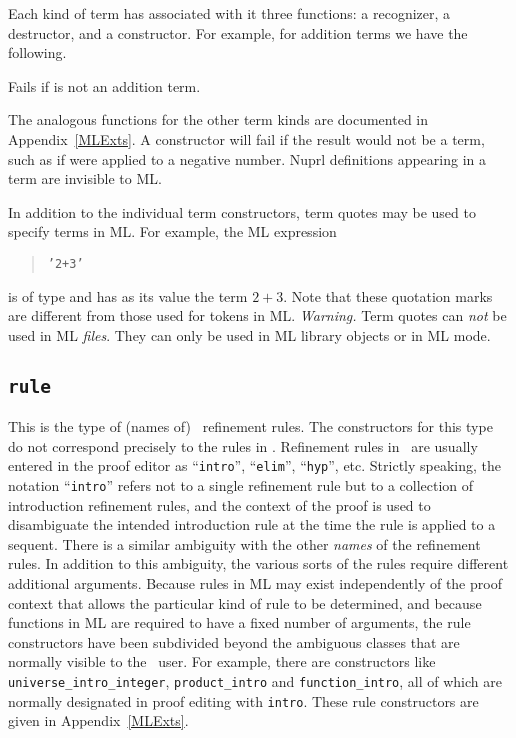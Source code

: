 Each kind of term has associated with it three functions: a recognizer, a
destructor, and a constructor.  For example, for addition terms we have the
following.


  Fails if 
is not an addition term.


\smallskip

The analogous functions for the other term kinds are documented in
Appendix~\ref{MLExts}.  A constructor will fail if the result would not be
a term, such as if  were applied to a negative number.
Nuprl definitions appearing in a term are invisible to ML.


In addition to the individual term constructors, term quotes may be used to
specify terms in ML.  For example, the ML expression 
\begin{quote}
\tt '2+3'
\end{quote}
is of type  and has as its value the term $2+3$.  
Note that these quotation marks are
different from those used for tokens in ML.  {\em Warning.}  Term quotes
can {\em not} be used in ML {\em files}.  They can only be used in ML
library objects or in ML mode.  


    
\subsection*{\tt rule}

This is the type of (names of) \prl\ refinement rules.  
The constructors for this type do not correspond
precisely to the rules in \nuprl.  Refinement rules in \prl\ are usually
entered in the proof editor
as ``{\tt intro}'', ``{\tt elim}'', ``{\tt hyp}'', etc.  Strictly
speaking, the notation ``{\tt intro}'' refers not to a single refinement
rule but to a collection of introduction refinement rules, and the context
of the proof is used to disambiguate the intended introduction rule at the
time the rule is applied to a sequent.  There is a similar ambiguity with
the other {\em names} of the refinement rules.  In addition to this
ambiguity, the various sorts of the rules require different additional
arguments.  Because rules in ML may exist independently of the proof
context that allows the particular kind of rule to be determined, and
because functions in ML are required to have a fixed number of arguments,
the rule constructors have been subdivided beyond the ambiguous classes
that are normally visible to the \prl\ user.  For example, there are
constructors like {\tt universe\_intro\_integer}, {\tt product\_intro} and
{\tt function\_intro}, all of which are normally designated in proof
editing with {\tt intro}.  
These rule constructors are given in Appendix~\ref{MLExts}.  

